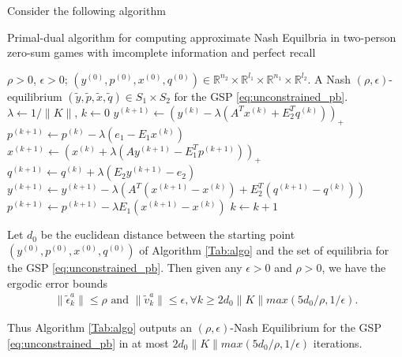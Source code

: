 \documentclass[envcountsame]{llncs} %
\begin{document}
Consider the following algorithm
\begin{algorithm}
\caption{Primal-dual algorithm for computing approximate Nash
  Equilbria in two-person zero-sum games with imcomplete information
  and perfect recall}
\label{Tab:algo}
\begin{algorithmic}[1]
\Require $\rho >0$, $\epsilon > 0$; $(y^{(0)},p^{(0)},x^{(0)},q^{(0)})
\in \mathbb{R}^{n_2}
  \times \mathbb{R}^{l_1} \times \mathbb{R}^{n_1} \times
  \mathbb{R}^{l_2}$.
\Ensure A Nash $(\rho, \epsilon)$-equilibrium
$(\tilde{y},\tilde{p},\tilde{x},\tilde{q}) \in S_1 \times S_2$ for
the GSP \eqref{eq:unconstrained_pb}.
\State  $\lambda \leftarrow 1/\|K\|$,
$k \leftarrow 0$
\State $y^{(k + 1)} \leftarrow (y^{(k)} - \lambda (A^Tx^{(k)} +
E_2^Tq^{(k)}))_+$
\State  \hspace{.5em}$p^{(k+1)} \leftarrow p^{(k)} -
\lambda(e_1-E_1x^{(k)})$
\State $x^{(k + 1)} \leftarrow (x^{(k)} + \lambda (Ay^{(k+1)} -
E_1^Tp^{(k+1)}))_+$
\State  \hspace{.5em}$q^{(k+1)} \leftarrow q^{(k)} +
\lambda(E_2y^{(k+1)}-e_2)$
\State $y^{(k+1)} \leftarrow y^{(k+1)} - \lambda
(A^T(x^{(k+1)}-x^{(k)}) + E_2^T(q^{(k+1)}-q^{(k)}))$
\State $p^{(k+1)} \leftarrow p^{(k+1)} - \lambda E_1(x^{(k+1)}-x^{(k)})$
\State $k \leftarrow k + 1$
\EndWhile
\end{algorithmic}
\end{algorithm}

\begin{theorem}
Let $d_0$ be the euclidean distance between the starting point
$(y^{(0)},p^{(0)},x^{(0)},q^{(0)})$ of Algorithm \ref{Tab:algo} and the
set of equilibria for the GSP \eqref{eq:unconstrained_pb}.
Then given any $\epsilon > 0$ and $\rho > 0$, we have the ergodic
error bounds
\begin{eqnarray}
\|\tilde{\epsilon}^{a}_k\| \le \rho\text{ and }\|\tilde{v}^{a}_k\| \le
\epsilon, \forall k \ge 2d_0\|K\|max(5d_0/\rho, 1/\epsilon).
\end{eqnarray}

Thus Algorithm \ref{Tab:algo} outputs an $(\rho,\epsilon)$-Nash
Equilibrium for the GSP \eqref{eq:unconstrained_pb}
in at most $2d_0\|K\|max(5d_0/\rho, 1/\epsilon)$ iterations.
\end{theorem}
\end{document}
